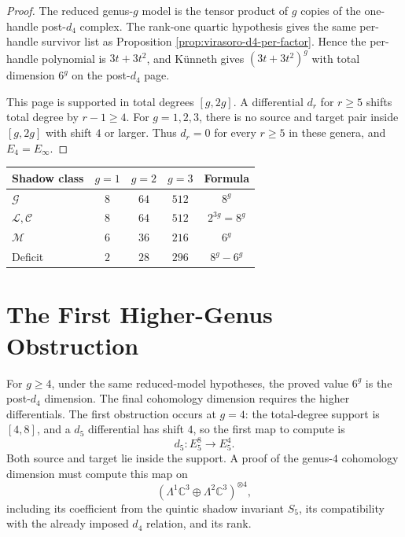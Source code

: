 \documentclass[11pt]{article}
\theoremstyle{plain}
\theoremstyle{definition}
\theoremstyle{remark}
\newcommand{\C}{\mathbb{C}}
\begin{document}
\begin{proof}
The reduced genus-$g$ model is the tensor product of $g$ copies of the
one-handle post-$d_4$ complex. The rank-one quartic hypothesis gives the
same per-handle survivor list as Proposition
\ref{prop:virasoro-d4-per-factor}. Hence the per-handle polynomial is
$3t+3t^2$, and K\"unneth gives $(3t+3t^2)^g$ with total dimension $6^g$ on
the post-$d_4$ page.

This page is supported in total degrees $[g,2g]$. A differential $d_r$ for
$r\geq 5$ shifts total degree by $r-1\geq 4$. For $g=1,2,3$, there is no
source and target pair inside $[g,2g]$ with shift $4$ or larger. Thus
$d_r=0$ for every $r\geq 5$ in these genera, and $E_4=E_\infty$.
\end{proof}

\begin{center}
\renewcommand{\arraystretch}{1.2}
\begin{tabular}{lcccc}
\toprule
 Shadow class & $g=1$ & $g=2$ & $g=3$ & Formula \\
 \midrule
 $\mathcal{G}$ & $8$ & $64$ & $512$ & $8^g$ \\
 $\mathcal{L},\mathcal{C}$ & $8$ & $64$ & $512$ & $2^{3g}=8^g$ \\
 $\mathcal{M}$ & $6$ & $36$ & $216$ & $6^g$ \\
 Deficit & $2$ & $28$ & $296$ & $8^g-6^g$ \\
 \bottomrule
\end{tabular}
\end{center}

\section{The First Higher-Genus Obstruction}
\label{sec:higher-genus-obstruction}

For $g\geq 4$, under the same reduced-model hypotheses, the proved value
$6^g$ is the post-$d_4$ dimension. The final cohomology dimension requires
the higher differentials. The first obstruction occurs at $g=4$: the
total-degree support is $[4,8]$, and a $d_5$ differential has shift $4$, so
the first map to compute is
\[
 d_5 \colon E_5^{8}\longrightarrow E_5^{4}.
\]
Both source and target lie inside the support. A proof of the genus-$4$
cohomology dimension must compute this map on
\[
 (\Lambda^1\C^3\oplus\Lambda^2\C^3)^{\otimes 4},
\]
including its coefficient from the quintic shadow invariant $S_5$, its
compatibility with the already imposed $d_4$ relation, and its rank.
\end{document}
